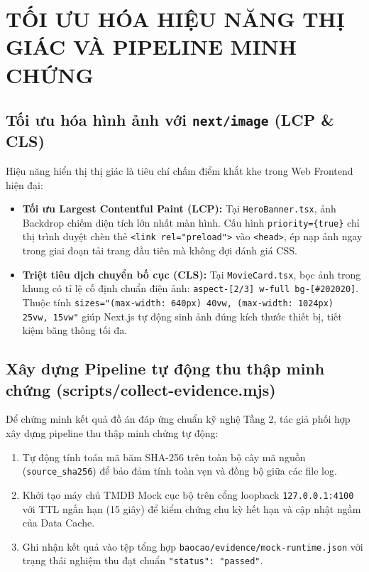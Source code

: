 \documentclass[12pt,a4paper]{extarticle}
\begin{document}
\section{TỐI ƯU HÓA HIỆU NĂNG THỊ GIÁC VÀ PIPELINE MINH CHỨNG}

\subsection{Tối ưu hóa hình ảnh với \texttt{next/image} (LCP \& CLS)}
Hiệu năng hiển thị thị giác là tiêu chí chấm điểm khắt khe trong Web Frontend hiện đại:
\begin{itemize}
    \item \textbf{Tối ưu Largest Contentful Paint (LCP):} Tại \texttt{HeroBanner.tsx}, ảnh Backdrop chiếm diện tích lớn nhất màn hình. Cấu hình \texttt{priority=\{true\}} chỉ thị trình duyệt chèn thẻ \texttt{<link rel="preload">} vào \texttt{<head>}, ép nạp ảnh ngay trong giai đoạn tải trang đầu tiên mà không đợi đánh giá CSS.
    \item \textbf{Triệt tiêu dịch chuyển bố cục (CLS):} Tại \texttt{MovieCard.tsx}, bọc ảnh trong khung có tỉ lệ cố định chuẩn điện ảnh: \texttt{aspect-[2/3] w-full bg-[\#202020]}. Thuộc tính \texttt{sizes="(max-width: 640px) 40vw, (max-width: 1024px) 25vw, 15vw"} giúp Next.js tự động sinh ảnh đúng kích thước thiết bị, tiết kiệm băng thông tối đa.
\end{itemize}

\subsection{Xây dựng Pipeline tự động thu thập minh chứng (scripts/collect-evidence.mjs)}
Để chứng minh kết quả đồ án đáp ứng chuẩn kỹ nghệ Tầng 2, tác giả phối hợp xây dựng pipeline thu thập minh chứng tự động:
\begin{enumerate}
    \item Tự động tính toán mã băm SHA-256 trên toàn bộ cây mã nguồn (\texttt{source\_sha256}) để bảo đảm tính toàn vẹn và đồng bộ giữa các file log.
    \item Khởi tạo máy chủ TMDB Mock cục bộ trên cổng loopback \texttt{127.0.0.1:4100} với TTL ngắn hạn (15 giây) để kiểm chứng chu kỳ hết hạn và cập nhật ngầm của Data Cache.
    \item Ghi nhận kết quả vào tệp tổng hợp \texttt{baocao/evidence/mock-runtime.json} với trạng thái nghiệm thu đạt chuẩn \texttt{"status": "passed"}.
\end{enumerate}
\end{document}
